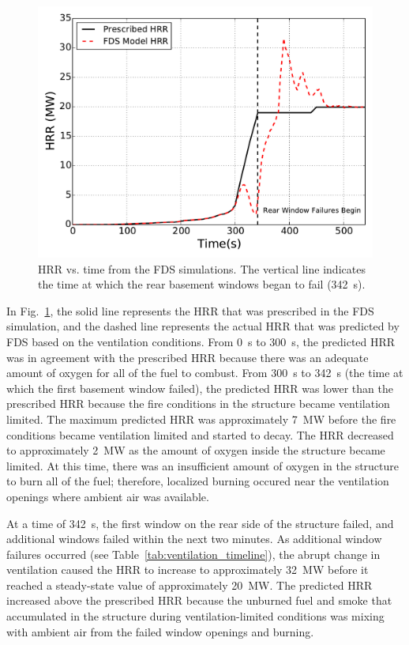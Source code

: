 \documentclass[12pt,oneside]{book}
\begin{document}
\begin{figure}[!ht]
\includegraphics[width=5.5in]{../Figures/Fire_HRR_w_FDS}
\caption[HRR vs. time from the FDS simulations.]
{HRR vs. time from the FDS simulations. The vertical line indicates the time at which the rear basement windows began to fail (342~s).}
\label{fig:hrr_w_fds}
\end{figure}


\clearpage


In Fig.~\ref{fig:hrr_w_fds}, the solid line represents the HRR that was prescribed in the FDS simulation, and the dashed line represents the actual HRR that was predicted by FDS based on the ventilation conditions. From 0~s to 300~s, the predicted HRR was in agreement with the prescribed HRR because there was an adequate amount of oxygen for all of the fuel to combust. From 300~s to 342~s (the time at which the first basement window failed), the predicted HRR was lower than the prescribed HRR because the fire conditions in the structure became ventilation limited. The maximum predicted HRR was approximately 7~MW before the fire conditions became ventilation limited and started to decay. The HRR decreased to approximately 2~MW as the amount of oxygen inside the structure became limited. At this time, there was an insufficient amount of oxygen in the structure to burn all of the fuel; therefore, localized burning occured near the ventilation openings where ambient air was available.

At a time of 342~s, the first window on the rear side of the structure failed, and additional windows failed within the next two minutes. As additional window failures occurred (see Table~\ref{tab:ventilation_timeline}), the abrupt change in ventilation caused the HRR to increase to approximately 32~MW before it reached a steady-state value of approximately 20~MW. The predicted HRR increased above the prescribed HRR because the unburned fuel and smoke that accumulated in the structure during ventilation-limited conditions was mixing with ambient air from the failed window openings and burning.
\end{document}
